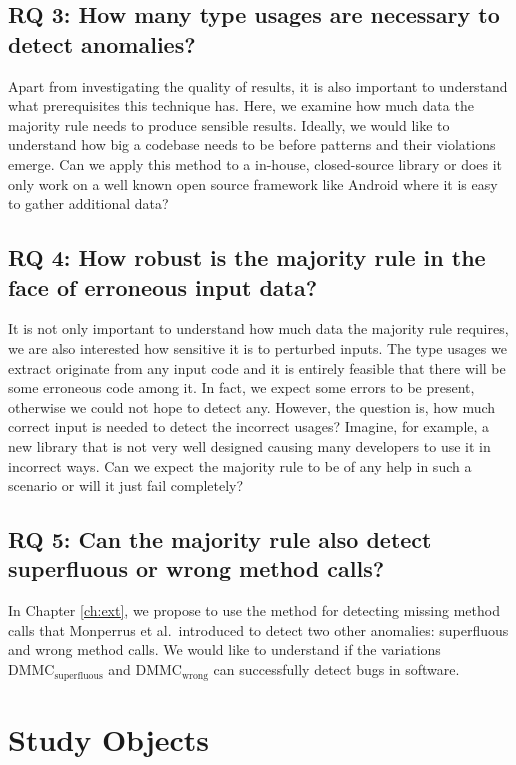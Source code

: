 \subsection*{RQ 3: How many type usages are necessary to detect anomalies?}

Apart from investigating the quality of results, it is also important to understand what prerequisites this technique has.
Here, we examine how much data the majority rule needs to produce sensible results.
Ideally, we would like to understand how big a codebase needs to be before patterns and their violations emerge.
Can we apply this method to a in-house, closed-source library or does it only work on a well known open source framework like Android where it is easy to gather additional data?

\subsection*{RQ 4: How robust is the majority rule in the face of erroneous input data?}

It is not only important to understand how much data the majority rule requires, we are also interested how sensitive it is to perturbed inputs.
The type usages we extract originate from any input code and it is entirely feasible that there will be some erroneous code among it.
In fact, we expect some errors to be present, otherwise we could not hope to detect any.
However, the question is, how much correct input is needed to detect the incorrect usages?
Imagine, for example, a new library that is not very well designed causing many developers to use it in incorrect ways.
Can we expect the majority rule to be of any help in such a scenario or will it just fail completely?

\subsection*{RQ 5: Can the majority rule also detect superfluous or wrong method calls?}

In Chapter \ref{ch:ext}, we propose to use the method for detecting missing method calls that Monperrus et al.\ introduced to detect two other anomalies: superfluous and wrong method calls.
We would like to understand if the variations $\text{DMMC}_\text{superfluous}$ and $\text{DMMC}_\text{wrong}$ can successfully detect bugs in software.

\section{Study Objects} 

